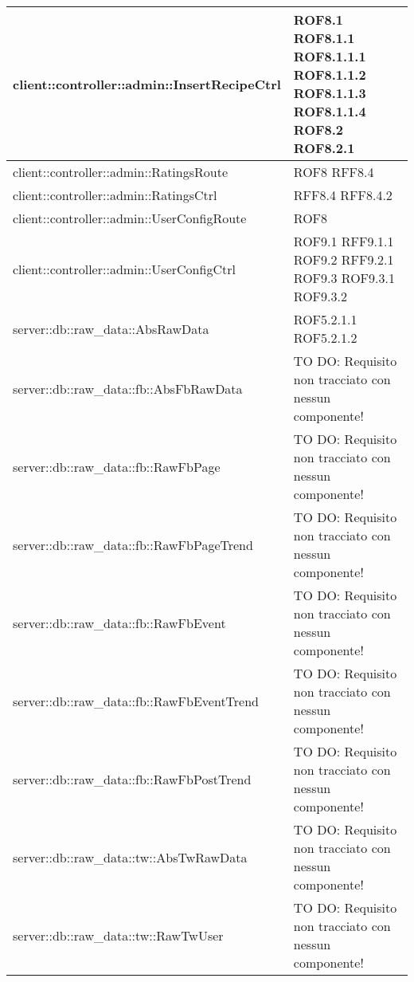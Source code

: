\begin{center}
\begin{longtable}{| p{11cm} | p{2.5cm} |}
\hline
client::controller::admin::InsertRecipeCtrl & ROF8.1 \newline ROF8.1.1 \newline ROF8.1.1.1 \newline ROF8.1.1.2 \newline ROF8.1.1.3 \newline ROF8.1.1.4 \newline ROF8.2 \newline ROF8.2.1 \\
\hline
client::controller::admin::RatingsRoute & ROF8 \newline RFF8.4 \\
\hline
client::controller::admin::RatingsCtrl & RFF8.4 \newline RFF8.4.2 \\
\hline
client::controller::admin::UserConfigRoute & ROF8 \\
\hline
client::controller::admin::UserConfigCtrl & ROF9.1 \newline RFF9.1.1 \newline ROF9.2 \newline RFF9.2.1 \newline ROF9.3 \newline ROF9.3.1 \newline ROF9.3.2 \\
\hline
server::db::raw\_data::AbsRawData & ROF5.2.1.1 \newline ROF5.2.1.2 \\
\hline
server::db::raw\_data::fb::AbsFbRawData & TO DO: Requisito non tracciato con nessun componente! \\
\hline
server::db::raw\_data::fb::RawFbPage & TO DO: Requisito non tracciato con nessun componente! \\
\hline
server::db::raw\_data::fb::RawFbPageTrend & TO DO: Requisito non tracciato con nessun componente! \\
\hline
server::db::raw\_data::fb::RawFbEvent & TO DO: Requisito non tracciato con nessun componente! \\
\hline
server::db::raw\_data::fb::RawFbEventTrend & TO DO: Requisito non tracciato con nessun componente! \\
\hline
server::db::raw\_data::fb::RawFbPostTrend & TO DO: Requisito non tracciato con nessun componente! \\
\hline
server::db::raw\_data::tw::AbsTwRawData & TO DO: Requisito non tracciato con nessun componente! \\
\hline
server::db::raw\_data::tw::RawTwUser & TO DO: Requisito non tracciato con nessun componente! \\

\end{longtable}
\end{center}
